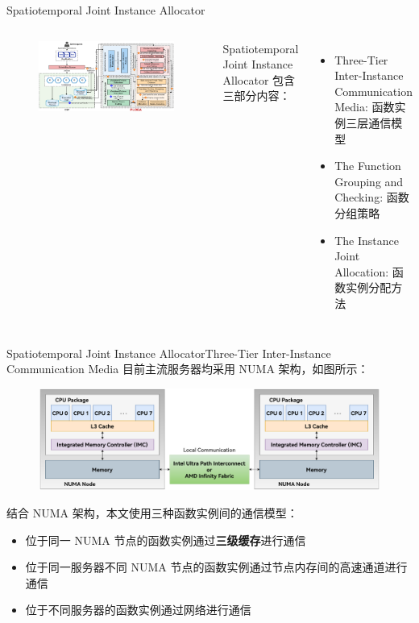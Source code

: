 \documentclass[aspectratio=169]{beamer}
\begin{document}
\begin{frame}{Spatiotemporal Joint Instance Allocator}\label{label:spatiotemporal-joint-instance-allocator}
  \begin{columns}
    \begin{figure}
      \centering
      \includegraphics[scale=1.4]{img/method/spatiotemporal-joint-instance-allocator.pdf}
    \end{figure}

    Spatiotemporal Joint Instance Allocator 包含三部分内容：
    \begin{itemize}
      \item Three-Tier Inter-Instance Communication Media: 函数实例三层通信模型
      \item The Function Grouping and Checking: 函数分组策略
      \item The Instance Joint Allocation: 函数实例分配方法
    \end{itemize}
  \end{columns}
  \hfill\hyperlink{label:architecture-2}{}
\end{frame}

\begin{frame}{Spatiotemporal Joint Instance Allocator}{Three-Tier Inter-Instance Communication Media}
  目前主流服务器均采用 NUMA 架构，如图所示：
  \begin{figure}
    \centering
    \includegraphics[height=0.5\textheight]{img/method/numa-architecture.pdf}
  \end{figure}
  结合 NUMA 架构，本文使用三种函数实例间的通信模型：
  \begin{itemize}
    \item 位于同一 NUMA 节点的函数实例通过\textbf{三级缓存}进行通信
    \item 位于同一服务器不同 NUMA 节点的函数实例通过节点内存间的高速通道进行通信
    \item 位于不同服务器的函数实例通过网络进行通信
  \end{itemize}
\end{frame}
\end{document}
